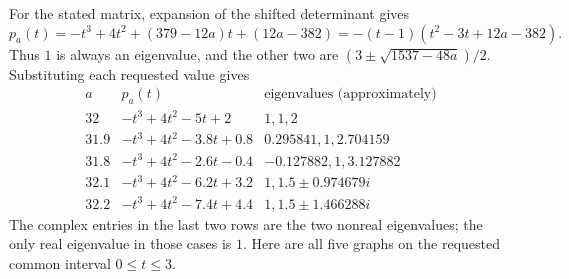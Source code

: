 For the stated matrix, expansion of the shifted determinant gives
\[
 p_a(t)=-t^3+4t^2+(379-12a)t+(12a-382)
       =-(t-1)(t^2-3t+12a-382).
\]
Thus $1$ is always an eigenvalue, and the other two are
$(3\pm\sqrt{1537-48a})/2$. Substituting each requested value gives
\[
\begin{array}{c|l|l}
 a&p_a(t)&\text{eigenvalues (approximately)}\\\hline
32&-t^3+4t^2-5t+2&1,1,2\\
31.9&-t^3+4t^2-3.8t+0.8&0.295841,1,2.704159\\
31.8&-t^3+4t^2-2.6t-0.4&-0.127882,1,3.127882\\
32.1&-t^3+4t^2-6.2t+3.2&1,1.5\pm0.974679i\\
32.2&-t^3+4t^2-7.4t+4.4&1,1.5\pm1.466288i
\end{array}
\]
The complex entries in the last two rows are the two nonreal eigenvalues;
the only real eigenvalue in those cases is $1$.
Here are all five graphs on the requested common interval $0\le t\le3$.


